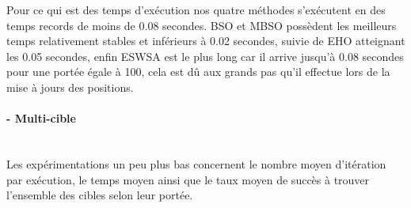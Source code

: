 Pour ce qui est des temps d'exécution nos quatre méthodes s'exécutent en des temps records de moins de 0.08 secondes. BSO et MBSO possèdent les meilleurs temps relativement stables et inférieurs à 0.02 secondes, suivie de EHO atteignant les 0.05 secondes, enfin ESWSA est le plus long car il arrive jusqu'à  0.08 secondes pour une portée égale à 100, cela est dû aux grands pas qu'il effectue lors de la mise à jours des positions.

\hspace{-1cm}
\begin{minipage}[t]{0.55\textwidth}
	\captionsetup{width=0.8\linewidth}
	\centering{}
	\label{IP1}
\end{minipage}\hfill
\hspace{-0.5cm}
\begin{minipage}[t]{0.55\textwidth}
	\captionsetup{width=0.8\linewidth}
	\centering{}
	\label{tP1}
\end{minipage}\hfill




\paragraph{- Multi-cible}
\textbf{ }\\
Les expérimentations un peu plus bas concernent le nombre moyen d'itération par exécution, le temps moyen ainsi que le taux moyen de succès à trouver l'ensemble des cibles selon leur portée.



